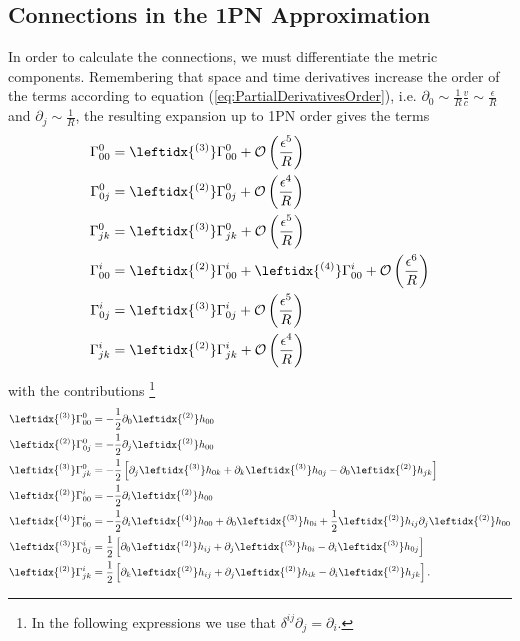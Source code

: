 \subsection{Connections in the 1PN Approximation}
In order to calculate the connections, we must differentiate the metric components. Remembering that space and time derivatives increase the order of the terms according to equation (\ref{eq:PartialDerivativesOrder}), i.e. $\partial_0 \sim  \frac{1}{R} \frac{v}{c} \sim \frac{\epsilon}{R} $ and $\partial_j \sim  \frac{1}{R}$, the resulting expansion up to 1PN order gives the terms
\begin{subequations} \label{eq:PNConnections}
\begin{align}
\Gamma ^0_{00} &=  \leftidx{^{(3)}}\Gamma ^0_{00} + \mathcal{O} \left( \frac{\epsilon ^5}{R} \right) \\
\Gamma ^0_{0j} &=  \leftidx{^{(2)}}\Gamma ^0_{0j} + \mathcal{O} \left( \frac{\epsilon ^4}{R} \right) \\
\Gamma ^0_{jk} &=   \leftidx{^{(3)}}\Gamma ^0_{jk} + \mathcal{O} \left( \frac{\epsilon ^5}{R} \right) \\
\Gamma ^i_{00} &=  \leftidx{^{(2)}}\Gamma ^i_{00} + \leftidx{^{(4)}}\Gamma ^i_{00} + \mathcal{O} \left( \frac{\epsilon ^6}{R} \right) \\
\Gamma ^i_{0j} &=  \leftidx{^{(3)}}\Gamma ^i_{0j} + \mathcal{O} \left( \frac{\epsilon ^5}{R} \right) \\
\Gamma ^i_{jk} &= \leftidx{^{(2)}}\Gamma ^i_{jk} + \mathcal{O} \left( \frac{\epsilon ^4}{R} \right) 
\end{align}
\end{subequations}
with the contributions \footnote{In the following expressions we use that $\delta^{ij} \partial_j = \partial_i$.} 
\begin{subequations} \label{eq:PNConnectionsComponents}
\begin{align}
\leftidx{^{(3)}}\Gamma ^0_{00} &= - \frac{1}{2} \partial _0 \leftidx{^{(2)}}h_{00} \\
\leftidx{^{(2)}}\Gamma ^0_{0j} &= - \frac{1}{2} \partial _j \leftidx{^{(2)}}h_{00} \\
\leftidx{^{(3)}}\Gamma ^0_{jk} &= - \frac{1}{2} \left[ \partial _j \leftidx{^{(3)}}h_{0k} + \partial _k \leftidx{^{(3)}}h_{0j} - \partial _0 \leftidx{^{(2)}}h_{jk} \right] \\
\leftidx{^{(2)}}\Gamma ^i_{00} &= - \frac{1}{2} \partial _i \leftidx{^{(2)}}h_{00} \\
\leftidx{^{(4)}}\Gamma ^i_{00} &= - \frac{1}{2} \partial _i \leftidx{^{(4)}}h_{00} + \partial _0 \leftidx{^{(3)}}h_{0i} + \frac{1}{2} \leftidx{^{(2)}}h_{ij}  \partial _j \leftidx{^{(2)}}h_{00}\\
\leftidx{^{(3)}}\Gamma ^i_{0j} &=  \frac{1}{2} \left[  \partial _0 \leftidx{^{(2)}}h_{ij} + \partial _j \leftidx{^{(3)}}h_{0i} - \partial _i \leftidx{^{(3)}}h_{0j} \right]\\
\leftidx{^{(2)}}\Gamma ^i_{jk} &= \frac{1}{2} \left[ \partial _k \leftidx{^{(2)}}h_{ij} + \partial _j \leftidx{^{(2)}}h_{ik} - \partial _i \leftidx{^{(2)}}h_{jk} \right].
\end{align}
\end{subequations}

